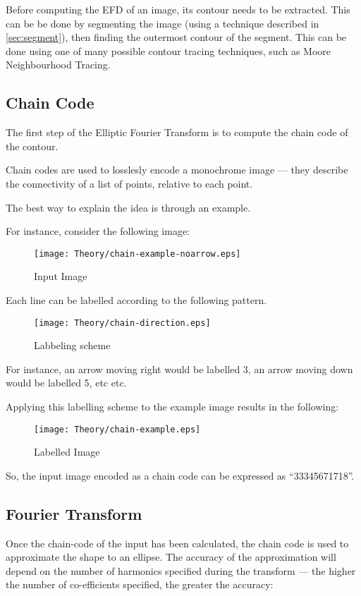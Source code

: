 Before computing the EFD of an image, its contour needs to be extracted. This can be be done by segmenting the image (using a technique described in \ref{sec:segment}), then finding the outermost contour of the segment. This can be done using one of many possible contour tracing techniques, such as Moore Neighbourhood Tracing.

\subsection{Chain Code}
The first step of the Elliptic Fourier Transform is to compute the chain code of the contour.

Chain codes are used to losslesly encode a monochrome image --- they describe the connectivity of a list of points, relative to each point.

The best way to explain the idea is through an example.

For instance, consider the following image:

\begin{figure}[H]
    \centering
    \texttt{[image: Theory/chain-example-noarrow.eps]}
    \caption{Input Image}
\end{figure}

Each line can be labelled according to the following pattern.

\begin{figure}[H]
    \centering
    \texttt{[image: Theory/chain-direction.eps]}
    \caption{Labbeling scheme}
\end{figure}

For instance, an arrow moving right would be labelled $3$, an arrow moving down would be labelled 5, etc etc. 

Applying this labelling scheme to the example image results in the following:

\begin{figure}[H]
    \centering
    \texttt{[image: Theory/chain-example.eps]}
    \caption{Labelled Image}
\end{figure}

So, the input image encoded as a chain code can be expressed as ``33345671718''. 

\subsection{Fourier Transform}
Once the chain-code of the input has been calculated, the chain code is used to approximate the shape to an ellipse. The accuracy of the approximation will depend on the number of harmonics specified during the transform --- the higher the number of co-efficients specified, the greater the accuracy:

